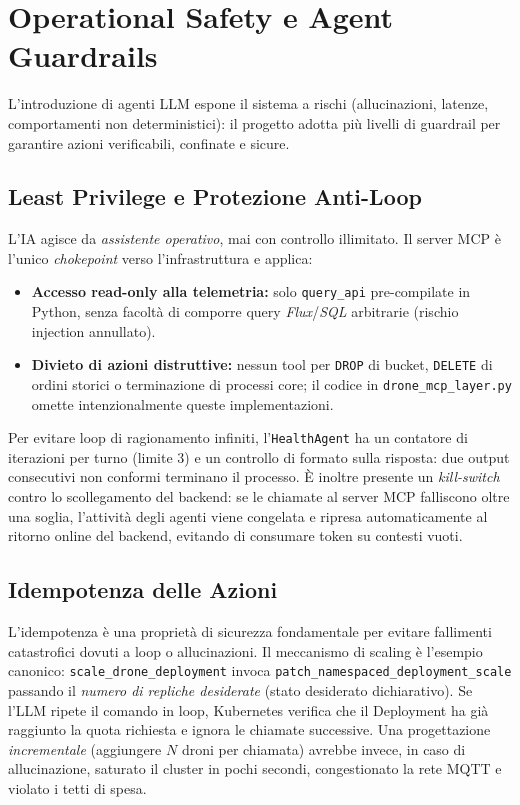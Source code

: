 
\chapter{Operational Safety e Agent Guardrails}
\label{cap:safety_guardrails}

L'introduzione di agenti LLM espone il sistema a rischi (allucinazioni, latenze, comportamenti non deterministici): il progetto adotta più livelli di guardrail per garantire azioni verificabili, confinate e sicure.

\section{Least Privilege e Protezione Anti-Loop}
\label{sec:least_privilege}

L'IA agisce da \emph{assistente operativo}, mai con controllo illimitato. Il server MCP è l'unico \textit{chokepoint} verso l'infrastruttura e applica:
\begin{itemize}
    \item \textbf{Accesso read-only alla telemetria:} solo \texttt{query\_api} pre-compilate in Python, senza facoltà di comporre query \textit{Flux}/\textit{SQL} arbitrarie (rischio injection annullato).
    \item \textbf{Divieto di azioni distruttive:} nessun tool per \texttt{DROP} di bucket, \texttt{DELETE} di ordini storici o terminazione di processi core; il codice in \texttt{drone\_mcp\_layer.py} omette intenzionalmente queste implementazioni.
\end{itemize}

Per evitare loop di ragionamento infiniti, l'\texttt{HealthAgent} ha un contatore di iterazioni per turno (limite 3) e un controllo di formato sulla risposta: due output consecutivi non conformi terminano il processo. È inoltre presente un \textit{kill-switch} contro lo scollegamento del backend: se le chiamate al server MCP falliscono oltre una soglia, l'attività degli agenti viene congelata e ripresa automaticamente al ritorno online del backend, evitando di consumare token su contesti vuoti.

\section{Idempotenza delle Azioni}
\label{sec:idempotenza_azioni}

L'idempotenza è una proprietà di sicurezza fondamentale per evitare fallimenti catastrofici dovuti a loop o allucinazioni. Il meccanismo di scaling è l'esempio canonico: \texttt{scale\_drone\_deployment} invoca \texttt{patch\_namespaced\_deployment\_scale} passando il \emph{numero di repliche desiderate} (stato desiderato dichiarativo). Se l'LLM ripete il comando in loop, Kubernetes verifica che il Deployment ha già raggiunto la quota richiesta e ignora le chiamate successive. Una progettazione \emph{incrementale} (aggiungere $N$ droni per chiamata) avrebbe invece, in caso di allucinazione, saturato il cluster in pochi secondi, congestionato la rete MQTT e violato i tetti di spesa.


